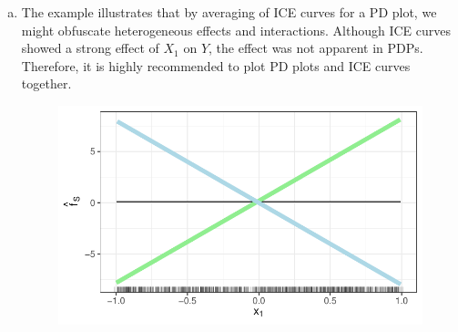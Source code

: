 {\begin{enumerate} [a)]
  The lightgreen dots correspond to group $X_2 = 1$, the lightblue dots to group $X_2 = 0$.
  
   \item The example illustrates that by averaging of ICE curves for a PD plot, 
   we might obfuscate heterogeneous effects and interactions. 
   Although ICE curves showed a strong effect of $X_1$ on $Y$, the effect was not 
   apparent in PDPs.
   Therefore, it is highly recommended to plot PD plots and ICE curves together. 

\begin{figure}[!ht]
  \centering
  \includegraphics[width=\maxwidth]{figure/pdpinteraction_ICE_curve_sol.pdf}
  \label{fig:pdp}
\end{figure}

  
\end{enumerate}
}